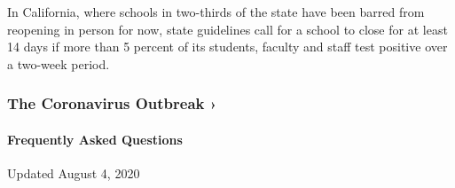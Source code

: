 In California, where schools in two-thirds of the state have been barred
from reopening in person for now, state guidelines call for a school to
close for at least 14 days if more than 5 percent of its students,
faculty and staff test positive over a two-week period.

\href{https://www.nytimes3xbfgragh.onion/news-event/coronavirus?action=click\&pgtype=Article\&state=default\&region=MAIN_CONTENT_3\&context=storylines_faq}{}

\hypertarget{the-coronavirus-outbreak-}{%
\subsubsection{The Coronavirus Outbreak
›}\label{the-coronavirus-outbreak-}}

\hypertarget{frequently-asked-questions}{%
\paragraph{Frequently Asked
Questions}\label{frequently-asked-questions}}

Updated August 4, 2020

